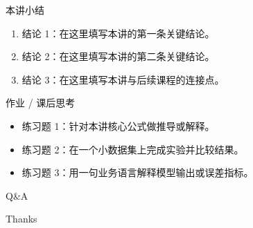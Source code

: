 \documentclass[aspectratio=169,professionalfonts]{beamer}
\begin{document}
\begin{frame}{本讲小结}
    \begin{enumerate}
        \item 结论 1：在这里填写本讲的第一条关键结论。
        \item 结论 2：在这里填写本讲的第二条关键结论。
        \item 结论 3：在这里填写本讲与后续课程的连接点。
    \end{enumerate}
\end{frame}

\begin{frame}{作业 / 课后思考}
    \begin{itemize}
        \item 练习题 1：针对本讲核心公式做推导或解释。
        \item 练习题 2：在一个小数据集上完成实验并比较结果。
        \item 练习题 3：用一句业务语言解释模型输出或误差指标。
    \end{itemize}
\end{frame}

\begin{frame}[plain]
    \centering
    \vspace{1.5cm}
    {\Huge Q\&A}

    \vspace{1cm}
    {\Large Thanks}
\end{frame}
\end{document}
